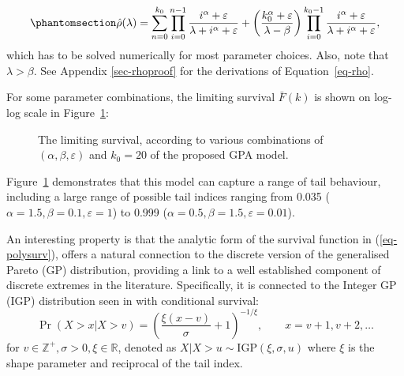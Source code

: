 \documentclass[
  sn-basic,
  10pt,
]{sn-jnl}
\theoremstyle{plain}
\theoremstyle{plain}
\theoremstyle{remark}
\begin{document}
\begin{equation}\phantomsection\label{eq-rho}{
\hat\rho(\lambda) = \sum_{n=0}^{k_0}\prod_{i=0}^{n-1}\frac{i^\alpha + \varepsilon}{\lambda+i^\alpha + \varepsilon} + \left(\frac{k_0^\alpha + \varepsilon}{\lambda-\beta}\right)\prod_{i=0}^{k_0-1}\frac{i^\alpha + \varepsilon}{\lambda + i^\alpha + \varepsilon}, 
}\end{equation} which has to be solved numerically for most parameter
choices. Also, note that \(\lambda>\beta\). See Appendix
\ref{sec-rhoproof} for the derivations of Equation~\ref{eq-rho}.

For some parameter combinations, the limiting survival \(\bar F(k)\) is
shown on log-log scale in Figure~\ref{fig-polylinsurv}:

\begin{figure}


\caption{\label{fig-polylinsurv}The limiting survival, according to
various combinations of \((\alpha, \beta, \varepsilon)\) and \(k_0=20\)
of the proposed GPA model.}

\end{figure}%

Figure~\ref{fig-polylinsurv} demonstrates that this model can capture a
range of tail behaviour, including a large range of possible tail
indices ranging from 0.035 (\(\alpha=1.5, \beta=0.1, \varepsilon=1\)) to
0.999 (\(\alpha=0.5, \beta=1.5, \varepsilon=0.01\)).

An interesting property is that the analytic form of the survival
function in (\ref{eq-polysurv}), offers a natural connection to the
discrete version of the generalised Pareto (GP) distribution, providing
a link to a well established component of discrete extremes in the
literature. Specifically, it is connected to the Integer GP (IGP)
distribution seen in \citet{Rohrbeck_2018} with conditional survival: \[
\Pr(X> x|X> v) = \left(\frac{\xi(x-v)}{\sigma} + 1\right)^{-1/\xi},\qquad  x=v+1,v+2,\ldots
\] for \(v\in\mathbb Z^+, \sigma>0,\xi\in \mathbb R\), denoted as
\(X|X>u \sim  \mathrm {IGP}(\xi, \sigma, u)\) where \(\xi\) is the shape
parameter and reciprocal of the tail index.
\end{document}
